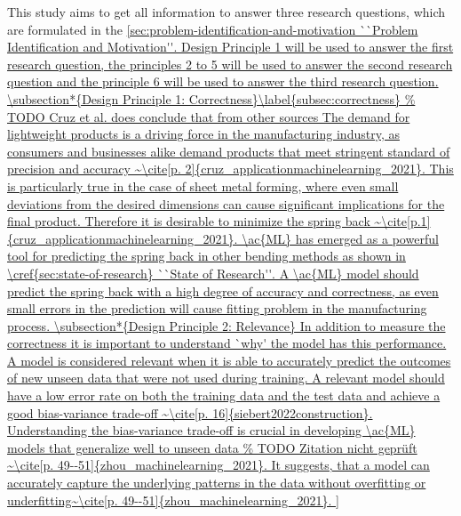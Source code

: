 This study aims to get all information to answer three research questions, which are formulated in the
\cref{sec:problem-identification-and-motivation ``Problem Identification and Motivation''.
Design Principle 1 will be used to answer the first research question, the principles 2 to 5 will be used to answer the
second research question and the principle 6 will be used to answer the third research question.

\subsection*{Design Principle 1: Correctness}\label{subsec:correctness}

The demand for lightweight products is a driving force in the manufacturing industry,
as consumers and businesses alike demand products that meet stringent standard of
precision and accuracy
~\cite[p. 2]{cruz_applicationmachinelearning_2021}.
This is particularly true in the case of sheet metal forming, where even small
deviations from the desired dimensions can cause significant implications for the final
product.
Therefore it is desirable to minimize the spring back
~\cite[p.1]{cruz_applicationmachinelearning_2021}.

\ac{ML} has emerged as a powerful tool for predicting the spring back in other bending
methods as shown in \cref{sec:state-of-research} ``State of Research''.
A \ac{ML} model should predict the spring back with a high degree of accuracy and
correctness, as even small errors in the prediction will cause fitting problem in the
manufacturing process.

\subsection*{Design Principle 2: Relevance}
In addition to measure the correctness it is important to understand `why'
the model has this performance.
A model is considered relevant when it is able to accurately predict the outcomes of
new unseen data that were not used during training.
A relevant model should have a low error rate on both the training data and the test
data and achieve a good bias-variance trade-off
~\cite[p. 16]{siebert2022construction}.

Understanding the bias-variance trade-off is crucial in developing \ac{ML} models that
generalize well to unseen data
~\cite[p. 49--51]{zhou_machinelearning_2021}.
It suggests, that a model can accurately capture the underlying patterns in the data
without overfitting or underfitting~\cite[p. 49--51]{zhou_machinelearning_2021}.

}
